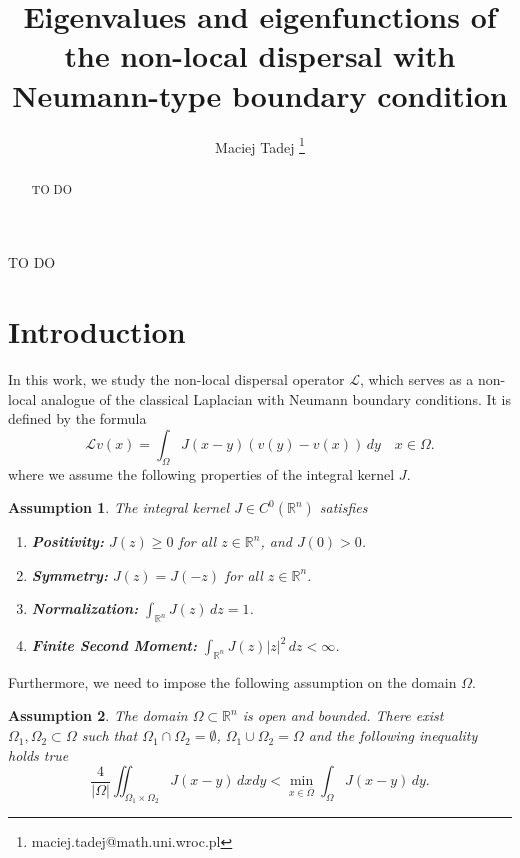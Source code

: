 \documentclass[11pt, a4paper]{article}
\title{Eigenvalues and eigenfunctions of the non-local dispersal with Neumann-type boundary condition}
\author[1]{Maciej Tadej \thanks{maciej.tadej@math.uni.wroc.pl}}
\affil[1]{\textit{Institute of Mathematics, University of Wrocław, pl. Grunwaldzki 2, 50-384 Wrocław, Poland}}
\date{}
\theoremstyle{break}
\theoremstyle{break}
\theoremstyle{break}
\newtheorem{asm}{Assumption}[section]
\theoremstyle{break}
\theoremstyle{break}
\theoremstyle{break}
\theoremstyle{break}
\theoremstyle{break}
\theoremstyle{break}
\begin{document}
\maketitle

\hspace{20pt}

\begin{abstract}
TO DO
\end{abstract}

\begin{keywords}
TO DO
\end{keywords}

\newpage

\section{Introduction}

In this work, we study the non-local dispersal operator $\mathcal{L}$, which serves as a non-local analogue of the classical Laplacian with Neumann boundary conditions. It is defined by the formula
\begin{equation}
    \label{EQ:NonLocalNeumann}
    \mathcal{L}v(x) = \int_{\Omega} J(x-y) (v(y) - v(x)) \, dy \quad x \in \Omega.
\end{equation}
where we assume the following properties of the integral kernel $J$.

\begin{asm} 
    \label{asm:KernelProperties}
    The integral kernel $J \in C^0(\mathbb{R}^n)$ satisfies
    \begin{enumerate}[label=(\textit{J\arabic*})]
        \item \textbf{Positivity:} $J(z) \geq 0$ for all $z \in \mathbb{R}^n$, and $J(0) > 0$.
        \item \textbf{Symmetry:} $J(z) = J(-z)$ for all $z \in \mathbb{R}^n$.
        \item \textbf{Normalization:} $\int_{\mathbb{R}^n} J(z) \, dz = 1$.
        \item \textbf{Finite Second Moment:} $\int_{\mathbb{R}^n} J(z)|z|^2 \, dz < \infty$.
    \end{enumerate}
\end{asm}

Furthermore, we need to impose the following assumption on the domain $\Omega$.

\begin{asm}
    \label{asm:DomainProperties}
    The domain $\Omega \subset \mathbb{R}^n$ is open and bounded. There exist $\Omega_1, \Omega_2 \subset \Omega$ such that $\Omega_1 \cap \Omega_2 = \emptyset$, $\Omega_1 \cup \Omega_2 = \Omega$ and the following inequality holds true
    \begin{equation}\label{eq:sufficient_cond}
        \frac{4}{|\Omega|} \iint_{\Omega_1 \times \Omega_2} J(x-y) \, dx dy < \min_{x \in \overline{\Omega}} \int_\Omega J(x-y) \, dy.
    \end{equation}
\end{asm}
\end{document}
